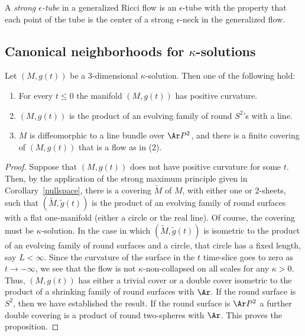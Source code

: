\begin{definition}\label{def:strong-epsilon-tube}
A {\em strong $\epsilon$-tube} in a
generalized Ricci flow is an $\epsilon$-tube with the property that
each point of the tube is the center of a strong $\epsilon$-neck in
the generalized flow.
\end{definition}

\subsection{Canonical neighborhoods for $\kappa$-solutions}


\begin{proposition}\label{prop:kappa-solution-trichotomy}
\label{infprod2}
Let $(M,g(t))$ be a  $3$-dimensional $\kappa$-solution.  Then one of
the following hold:
\begin{enumerate}
\item[(1)] For every $t\le 0$ the manifold $(M,g(t))$ has positive
curvature.
\item[(2)] $(M,g(t))$ is the product of an evolving family of
round $S^2$'s with a line.
\item[(3)] $M$ is diffeomorphic to a line  bundle over $\Ar P^2$, and
there is a finite covering of $(M,g(t))$ that is  a flow as in (2).
\end{enumerate}
\end{proposition}

\begin{proof}
Suppose that $(M,g(t))$ does not have positive curvature for some
$t$. Then, by the application of the strong maximum principle given
in Corollary~\ref{nullspace}, there is a covering $\widetilde M$ of
$M$, with either one or $2$-sheets, such that $(\widetilde M,\tilde
g(t))$ is the product of an evolving family of round surfaces with a
flat one-manifold (either a circle or the real line).  Of course,
the covering must be $\kappa$-solution. In the case in which
$(\widetilde M,\tilde g(t))$ is isometric to the product of an
evolving family of round surfaces  and a circle, that circle has a
fixed length, say $L<\infty$. Since the curvature of the surface in
the $t$ time-slice goes to zero as $t\rightarrow -\infty$, we see
that the flow is not $\kappa$-non-collapsed on all scales for any
$\kappa>0$. Thus, $(M,g(t))$ has either a trivial cover or a double
cover isometric to the product of a shrinking family of round
surfaces with $\Ar$. If the round surface is $S^2$, then we have
established the result. If the round surface is $\Ar P^2$ a further
double covering is a product of round two-spheres with $\Ar$.
 This proves the proposition.
\end{proof}

